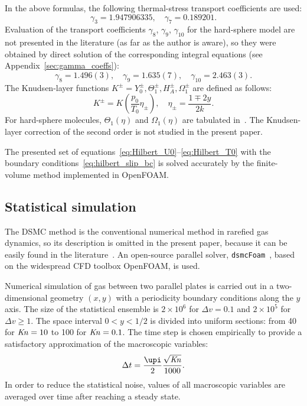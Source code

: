 \documentclass[]{jfm}
\newcommand{\Kn}{\mbox{\textit{Kn}}}
\begin{document}
In the above formulas, the following thermal-stress transport coefficients are used:
\begin{equation}\label{eq:gamma_tabular}
    \gamma_3 = 1.947906335, \quad \gamma_7 = 0.189201.
\end{equation}
Evaluation of the transport coefficients \(\gamma_8\), \(\gamma_9\), \(\gamma_{10}\)
for the hard-sphere model are not presented in the literature (as far as the author is aware),
so they were obtained by direct solution of the corresponding integral equations
(see Appendix~\ref{sec:gamma_coeffs}):
\begin{equation}\label{eq:gamma_numerical}
    \gamma_8 = 1.496(3), \quad \gamma_9 = 1.635(7), \quad \gamma_{10} = 2.463(3).
\end{equation}
The Knudsen-layer functions \(K^\pm = Y_0^\pm, \Theta_1^\pm, H_A^\pm, \Omega_1^\pm\)
are defined as follows:
\begin{equation}\label{eq:nonlinear_knudsen_functions}
     K^\pm = K\left(\frac{p_0}{T_0}\eta_\pm\right), \quad \eta_\pm = \frac{1 \mp 2y}{2k}.
\end{equation}
For hard-sphere molecules, \(\Theta_1(\eta)\) and \(\Omega_1(\eta)\)
are tabulated in~\citet{Ohwada1992, Sone2002, Sone2007, Takata2015}.
The Knudsen-layer correction of the second order is not studied in the present paper.

The presented set of equations~\eqref{eq:Hilbert_U0}--\eqref{eq:Hilbert_T0}
with the boundary conditions~\eqref{eq:hilbert_slip_bc}
is solved accurately by the finite-volume method
implemented in OpenFOAM\textregistered{}.

\subsection{Statistical simulation}

The DSMC method is the conventional numerical method in rarefied gas dynamics,
so its description is omitted in the present paper,
because it can be easily found in the literature~\citep[see e.g.][]{Bird1994, Sone2007}.
An open-source parallel solver, \verb+dsmcFoam+~\citep{Reese2010},
based on the widespread CFD toolbox OpenFOAM\textregistered{}, is used.

Numerical simulation of gas between two parallel plates is carried out
in a two-dimensional geometry \((x,y)\) with a periodicity boundary conditions along the \(y\) axis.
The size of the statistical ensemble is \(2\times10^6\) for \(\Delta{v}=0.1\)
and \(2\times10^5\) for \(\Delta{v}\ge1\).
The space interval \(0<y<1/2\) is divided into uniform sections:
from 40 for \(\Kn=10\) to 100 for \(\Kn=0.1\).
The time step is chosen empirically to provide a satisfactory approximation of the macroscopic variables:
\begin{equation}\label{eq:dsmc_timestep}
    \Delta{t} = \frac{\upi}2 \frac{\sqrt{\Kn}}{1000}.
\end{equation}
In order to reduce the statistical noise, values of all macroscopic variables
are averaged over time after reaching a steady state.
\end{document}
